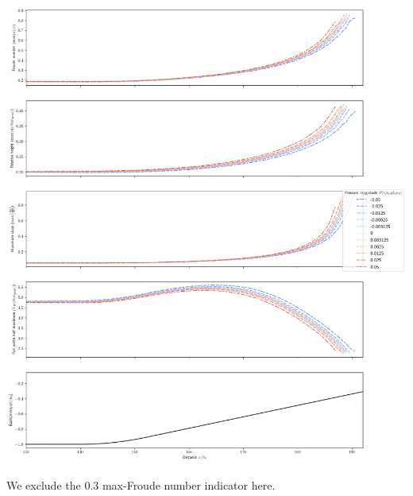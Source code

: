 \documentclass[10pt,a4paper]{article}
\begin{document}
\includegraphics[scale=0.35]{Fig4.png}

We exclude the 0.3 max-Froude number indicator here.
\end{document}
